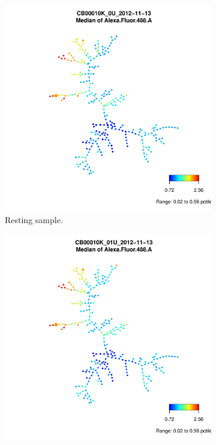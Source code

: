 \begin{figure}[h]
  \centering
\begin{subfigure}[b]{.4\textwidth}
  \includegraphics[scale=.4]{IL2/figures/CB00010K-0U-2012-11-13-spade.pdf}
\caption{Resting sample.}
\end{subfigure}
\begin{subfigure}[b]{.4\textwidth}
  \includegraphics[scale=.4]{IL2/figures/CB00010K-01U-2012-11-13-spade.pdf}

\end{subfigure}
\end{figure}

